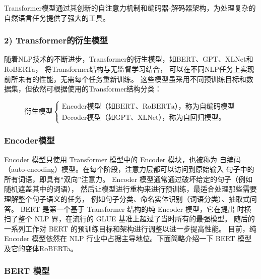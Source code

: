 Transformer模型通过其创新的自注意力机制和编码器-解码器架构，为处理复杂的自然语言任务提供了强大的工具。

\subsubsection*{2) Transformer的衍生模型}

随着NLP技术的不断进步，Transformer的衍生模型，如BERT、GPT、XLNet和RoBERTa，
将Transformer结构与无监督学习结合，
可以在不同NLP任务上实现前所未有的性能，无需每个任务重新训练。
这些模型虽采用不同预训练目标和数据集，但依然可根据使用的Transformer结构分类：

\begin{equation*}
  \text{衍生模型} \left\{
      \begin{array}{l}
        \text{Encoder模型（如BERT、RoBERTa），称为自编码模型} \\ 
        \text{Decoder模型（如GPT、XLNet），称为自回归模型。}
      \end{array}
  \right.
\end{equation*}



\subsubsection*{Encoder模型}

Encoder 模型只使用 Transformer 模型中的 Encoder 模块，也被称为
自编码（auto-encoding）模型。在每个阶段，注意力层都可以访问到原始输入
句子中的所有词语，即具有``双向''注意力。
Encoder 模型通常通过破坏给定的句子（例如随机遮盖其中的词语），
然后让模型进行重构来进行预训练，最适合处理那些需要理解整个句子语义的任务，
例如句子分类、命名实体识别（词语分类）、抽取式问答。
BERT 是第一个基于 Transformer 结构的纯 Encoder 模型，它在提出
时横扫了整个 NLP 界，在流行的 GLUE 基准上超过了当时所有的最强模型。
随后的一系列工作对 BERT 的预训练目标和架构进行调整以进一步提高性能。
目前，纯 Encoder 模型依然在 NLP 行业中占据主导地位。下面简略介绍一下 
BERT 模型及它的变体RoBERTa。

\subsubsection*{BERT 模型}


